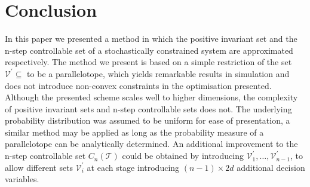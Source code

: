 \documentclass{ifacconf}
\providecommand{\V}{\mathcal V}
\providecommand{\T}{\mathcal T}
\begin{document}
\section{Conclusion}\label{sec:conclusion}
%
%
In this paper we presented a method in which the positive invariant set and the n-step controllable set of a stochastically constrained system are approximated respectively.
%
The method we present is based on a simple restriction of the set $\V^\prime\subseteq$ to be a parallelotope, which yields remarkable results in simulation and does not introduce non-convex constraints in the optimisation presented.
%
Although the presented scheme scales well to higher dimensions, the complexity of positive invariant sets and n-step controllable sets does not.
%
The underlying probability distribution was assumed to be uniform for ease of presentation, a similar method may be applied as long as the probability measure of a parallelotope can be analytically determined.
%
An additional improvement to the n-step controllable set $C_n(\T)$ could be obtained by introducing $\V_1^\prime,\dots,\V_{n-1}^\prime$, to allow different sets $\V_i^\prime$ at each stage introducing $(n-1)\times 2d$ additional decision variables.




\end{document}
